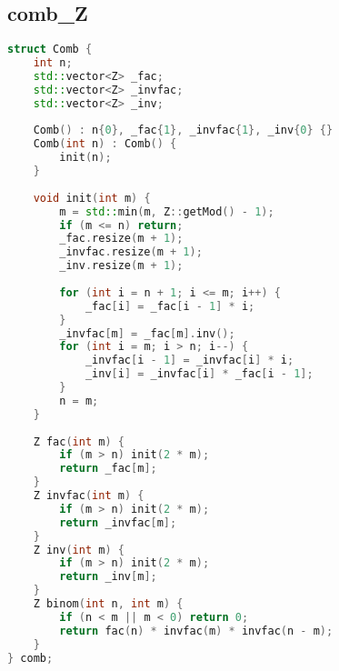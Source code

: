 \subsection{comb\_Z}
\begin{lstlisting}[language=C++]
struct Comb {
    int n;
    std::vector<Z> _fac;
    std::vector<Z> _invfac;
    std::vector<Z> _inv;
    
    Comb() : n{0}, _fac{1}, _invfac{1}, _inv{0} {}
    Comb(int n) : Comb() {
        init(n);
    }
    
    void init(int m) {
        m = std::min(m, Z::getMod() - 1);
        if (m <= n) return;
        _fac.resize(m + 1);
        _invfac.resize(m + 1);
        _inv.resize(m + 1);
        
        for (int i = n + 1; i <= m; i++) {
            _fac[i] = _fac[i - 1] * i;
        }
        _invfac[m] = _fac[m].inv();
        for (int i = m; i > n; i--) {
            _invfac[i - 1] = _invfac[i] * i;
            _inv[i] = _invfac[i] * _fac[i - 1];
        }
        n = m;
    }
    
    Z fac(int m) {
        if (m > n) init(2 * m);
        return _fac[m];
    }
    Z invfac(int m) {
        if (m > n) init(2 * m);
        return _invfac[m];
    }
    Z inv(int m) {
        if (m > n) init(2 * m);
        return _inv[m];
    }
    Z binom(int n, int m) {
        if (n < m || m < 0) return 0;
        return fac(n) * invfac(m) * invfac(n - m);
    }
} comb;

\end{lstlisting}
